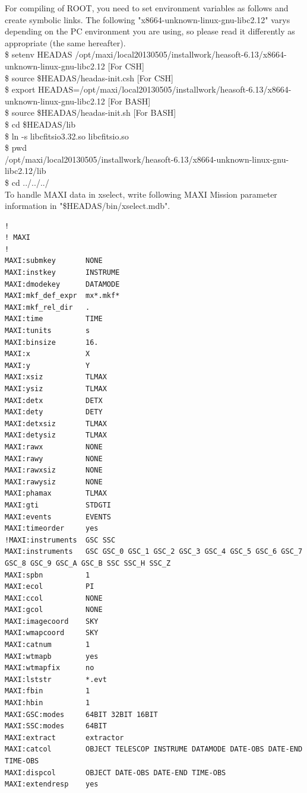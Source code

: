 \documentclass[10pt]{report}
\renewcommand{\_}{\textscale{.5}{\textbf{\textunderscore}}}
\begin{document}
\noindent For compiling of ROOT, you need to set environment variables as follows and create symbolic links. The following "x86\_64-unknown-linux-gnu-libc2.12" varys depending on the PC environment you are using, so please read it differently as appropriate (the same hereafter).\\

\noindent \$ setenv HEADAS /opt/maxi/local\_20130505/install\_work/heasoft-6.13/x86\_64-unknown-linux-gnu-libc2.12 \phantom{aa}[For CSH]\\
\$ source \$HEADAS/headas-init.csh \phantom{aa}[For CSH]\\
\$ export HEADAS=/opt/maxi/local\_20130505/install\_work/heasoft-6.13/x86\_64-unknown-linux-gnu-libc2.12
\phantom{aa}[For BASH]\\
\$ source \$HEADAS/headas-init.sh \phantom{aa}[For BASH]\\
\$ cd \$HEADAS/lib\\
\$ ln -s libcfitsio\_3.32.so libcfitsio.so\\
\$ pwd\\
\phantom{\$ }/opt/maxi/local\_20130505/install\_work/heasoft-6.13/x86\_64-unknown-linux-gnu-libc2.12/lib\\
\$ cd ../../../\\

\noindent To handle MAXI data in xselect, write following MAXI Mission parameter information in "\$HEADAS/bin/xselect.mdb".\\

\begin{lstlisting}[columns=fixed, basicstyle=\ttfamily\scriptsize]
!
! MAXI
!
MAXI:submkey       NONE
MAXI:instkey       INSTRUME
MAXI:dmodekey      DATAMODE
MAXI:mkf_def_expr  mx*.mkf*
MAXI:mkf_rel_dir   .
MAXI:time          TIME
MAXI:tunits        s
MAXI:binsize       16.
MAXI:x             X
MAXI:y             Y
MAXI:xsiz          TLMAX
MAXI:ysiz          TLMAX
MAXI:detx          DETX
MAXI:dety          DETY
MAXI:detxsiz       TLMAX
MAXI:detysiz       TLMAX
MAXI:rawx          NONE
MAXI:rawy          NONE
MAXI:rawxsiz       NONE
MAXI:rawysiz       NONE
MAXI:phamax        TLMAX
MAXI:gti           STDGTI
MAXI:events        EVENTS
MAXI:timeorder     yes
!MAXI:instruments  GSC SSC
MAXI:instruments   GSC GSC_0 GSC_1 GSC_2 GSC_3 GSC_4 GSC_5 GSC_6 GSC_7 GSC_8 GSC_9 GSC_A GSC_B SSC SSC_H SSC_Z
MAXI:spbn          1
MAXI:ecol          PI
MAXI:ccol          NONE
MAXI:gcol          NONE
MAXI:imagecoord    SKY
MAXI:wmapcoord     SKY
MAXI:catnum        1
MAXI:wtmapb        yes
MAXI:wtmapfix      no
MAXI:lststr        *.evt
MAXI:fbin          1
MAXI:hbin          1
MAXI:GSC:modes     64BIT 32BIT 16BIT
MAXI:SSC:modes     64BIT
MAXI:extract       extractor
MAXI:catcol        OBJECT TELESCOP INSTRUME DATAMODE DATE-OBS DATE-END TIME-OBS
MAXI:dispcol       OBJECT DATE-OBS DATE-END TIME-OBS
MAXI:extendresp    yes
\end{lstlisting}
\end{document}
